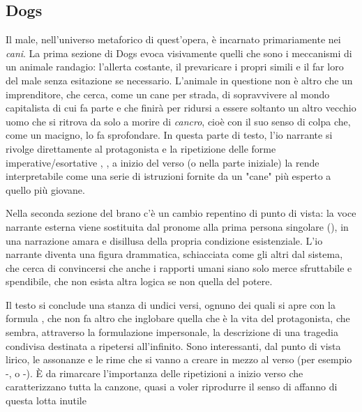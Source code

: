 \documentclass[class=book, crop=false, oneside, 12pt]{standalone}
\begin{document}
    \subsection{Dogs}
    Il male, nell'universo metaforico di quest'opera, è incarnato primariamente nei \emph{cani}. La prima sezione di Dogs evoca visivamente quelli che sono i meccanismi di un animale randagio: l'allerta costante, il prevaricare i propri simili e il far loro del male senza esitazione se necessario. L'animale in questione non è altro che un imprenditore, che cerca, come un cane per strada, di sopravvivere al mondo capitalista di cui fa parte e che finirà per ridursi a essere soltanto un altro vecchio uomo che si ritrova da solo a morire di \emph{cancro}, cioè con il suo senso di colpa che, come un macigno, lo fa sprofondare. In questa parte di testo, l'io narrante si rivolge direttamente al protagonista e la ripetizione delle forme  imperative/esortative , ,  a inizio del verso (o nella parte iniziale) la rende interpretabile come una serie di istruzioni fornite da un "cane" più esperto a quello più giovane.

    Nella seconda sezione del brano c'è un cambio repentino di punto di vista: la voce narrante esterna viene sostituita dal pronome alla prima persona singolare (), in una narrazione amara e disillusa della propria condizione esistenziale. L'io narrante diventa una figura drammatica, schiacciata come gli altri dal sistema, che cerca di convincersi che anche i rapporti umani siano solo merce sfruttabile e spendibile, che non esista altra logica se non quella del potere.

    Il testo si conclude una stanza di undici versi, ognuno dei quali si apre con la formula , che non fa altro che inglobare quella che è la vita del protagonista, che sembra, attraverso la formulazione impersonale, la descrizione di una tragedia condivisa destinata a ripetersi all'infinito. Sono interessanti, dal punto di vista lirico, le assonanze e le rime che si vanno a creare in mezzo al verso (per esempio -, o -). È da rimarcare l'importanza delle ripetizioni a inizio verso che caratterizzano tutta la canzone, quasi a voler riprodurre il senso di affanno di questa lotta inutile
\end{document}
